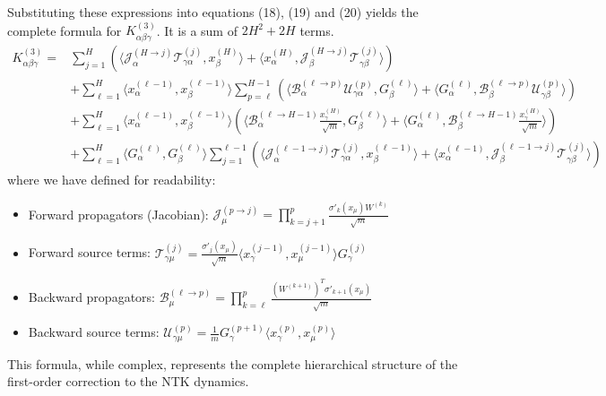 \documentclass[a4paper]{article}
\begin{document}
Substituting these expressions into equations (18), (19) and (20) yields the complete formula for $K^{(3)}_{\alpha\beta\gamma}$. It is a sum of $2H^2 + 2H$ terms.
\begin{align}
K^{(3)}_{\alpha\beta\gamma} = & \sum_{j=1}^{H} \left( \langle \mathcal{J}^{(H \to j)}_{\alpha} \mathcal{T}^{(j)}_{\gamma\alpha}, x^{(H)}_\beta \rangle + \langle x^{(H)}_\alpha, \mathcal{J}^{(H \to j)}_{\beta} \mathcal{T}^{(j)}_{\gamma\beta} \rangle \right) \nonumber \\
& + \sum_{\ell=1}^{H} \langle x^{(\ell-1)}_\alpha, x^{(\ell-1)}_\beta \rangle \sum_{p=\ell}^{H-1} \left( \langle \mathcal{B}^{(\ell \to p)}_{\alpha} \mathcal{U}^{(p)}_{\gamma\alpha}, G^{(\ell)}_\beta \rangle + \langle G^{(\ell)}_\alpha, \mathcal{B}^{(\ell \to p)}_{\beta} \mathcal{U}^{(p)}_{\gamma\beta} \rangle \right) \nonumber \\
& + \sum_{\ell=1}^{H} \langle x^{(\ell-1)}_\alpha, x^{(\ell-1)}_\beta \rangle \left( \langle \mathcal{B}^{(\ell \to H-1)}_{\alpha} \frac{x^{(H)}_\gamma}{\sqrt{m}}, G^{(\ell)}_\beta \rangle + \langle G^{(\ell)}_\alpha, \mathcal{B}^{(\ell \to H-1)}_{\beta} \frac{x^{(H)}_\gamma}{\sqrt{m}} \rangle \right) \nonumber \\
& + \sum_{\ell=1}^{H} \langle G^{(\ell)}_\alpha, G^{(\ell)}_\beta \rangle \sum_{j=1}^{\ell-1} \left( \langle \mathcal{J}^{(\ell-1 \to j)}_{\alpha} \mathcal{T}^{(j)}_{\gamma\alpha}, x^{(\ell-1)}_\beta \rangle + \langle x^{(\ell-1)}_\alpha, \mathcal{J}^{(\ell-1 \to j)}_{\beta} \mathcal{T}^{(j)}_{\gamma\beta} \rangle \right)
\end{align}
where we have defined for readability:
\begin{itemize}
    \item Forward propagators (Jacobian): $\mathcal{J}^{(p \to j)}_{\mu} = \prod_{k=j+1}^{p} \frac{\sigma'_{k}(x_\mu) W^{(k)}}{\sqrt{m}}$
    \item Forward source terms: $\mathcal{T}^{(j)}_{\gamma\mu} = \frac{\sigma'_{j}(x_\mu)}{\sqrt{m}} \langle x^{(j-1)}_\gamma, x^{(j-1)}_\mu \rangle G^{(j)}_\gamma$
    \item Backward propagators: $\mathcal{B}^{(\ell \to p)}_{\mu} = \prod_{k=\ell}^{p} \frac{(W^{(k+1)})^T \sigma'_{k+1}(x_\mu)}{\sqrt{m}}$
    \item Backward source terms: $\mathcal{U}^{(p)}_{\gamma\mu} = \frac{1}{m} G^{(p+1)}_\gamma \langle x^{(p)}_\gamma, x^{(p)}_\mu \rangle$
\end{itemize}
This formula, while complex, represents the complete hierarchical structure of the first-order correction to the NTK dynamics.
\end{document}
